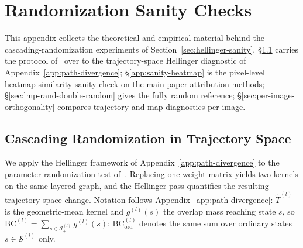 \documentclass[twoside]{article}
\newcommand{\1}{\mathbf{1}}
\begin{document}
\begin{table}[H]
    \centering\small
    \setlength{\tabcolsep}{4pt}
    
    \caption{Reference baselines for the input-noise sweep, averaged over $R$ pairs drawn from the
    $565$-image ImageNet-S test split (clean rows: $R=200$ sampled pairs; clean-vs-random: $R=565$
    images paired with a fresh Gaussian each; random-vs-random: $R=200$ Gaussian pairs); entries are
    mean $\pm$ standard deviation over pairs. \textbf{clean-intraclass}: $\mathrm{H}(\Pi_A(x_1),
        \Pi_A(x_2))$ with $x_1, x_2$ from the same ground-truth class; \textbf{clean-interclass}: same,
    with distinct classes; \textbf{clean-vs-random}: one side clean, other Gaussian;
    \textbf{random-vs-random}: both sides Gaussian.}
    \label{tab:hellinger-input-random}
\end{table}
\newpage
\section{Randomization Sanity Checks}\label{app:sanity-check}

This appendix collects the theoretical and empirical material behind the cascading-randomization
experiments of Section~\ref{sec:hellinger-sanity}.  \S\ref{sec:lmp-randomization} carries the
protocol of~\citet{Adebayo2018sanity} over to the trajectory-space Hellinger diagnostic of
Appendix~\ref{app:path-divergence}; \S\ref{app:sanity-heatmap} is the pixel-level
heatmap-similarity sanity check on the main-paper attribution methods;
\S\ref{sec:lmp-rand-double-random} gives the fully random reference;
\S\ref{sec:per-image-orthogonality} compares trajectory and map diagnostics per image.

\subsection{Cascading Randomization in Trajectory Space}\label{sec:lmp-randomization}

We apply the Hellinger framework of Appendix~\ref{app:path-divergence} to the parameter
randomization test of~\citet{Adebayo2018sanity}.  Replacing one weight matrix yields two kernels on
the same layered graph, and the Hellinger pass quantifies the resulting trajectory-space change.
Notation follows Appendix~\ref{app:path-divergence}: $\widetilde{T}^{(l)}$ is the geometric-mean
kernel and $g^{(l)}(s)$ the overlap mass reaching state $s$, so $\mathrm{BC}^{(l)} = \sum_{s \in
    \mathcal{S}^{(l)}_+} g^{(l)}(s)$; $\mathrm{BC}^{(l)}_{\mathrm{ord}}$ denotes the same sum over
ordinary states $s \in \mathcal{S}^{(l)}$ only.
\end{document}
